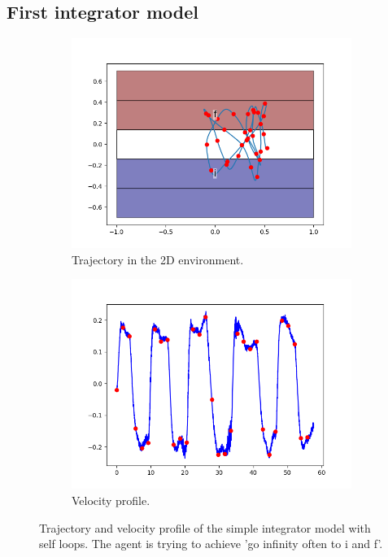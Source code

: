 \documentclass{article}
\theoremstyle{named}
\begin{document}
\subsection{First integrator model} \label{sec:single_int}

\begin{figure}[!ht]
	\begin{subfigure}[b]{0.5\textwidth}
  		\centering
  		\includegraphics[width=0.9\linewidth]{simple_1D}
	  	\caption{Trajectory in the 2D environment.}
	  	\label{simple_1D}
  \end{subfigure}
	\begin{subfigure}[b]{0.5\textwidth}
  		\centering
  		\includegraphics[width=0.9\linewidth]{simple_1D_vel}
	  	\caption{Velocity profile.}
	  	\label{simple_1D_vel}
  \end{subfigure}
  \caption{Trajectory and velocity profile of the simple integrator model with self loops. The agent is trying to achieve 'go infinity often to i and f'.}
\end{figure}
\end{document}
